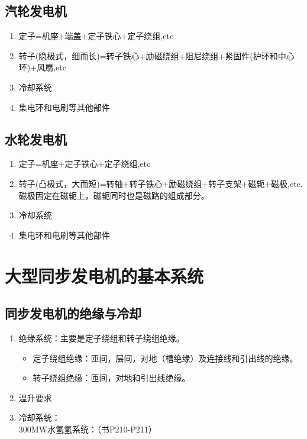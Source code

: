\documentclass[blue]{elegantnote}
\begin{document}
\subsection{汽轮发电机}
\begin{enumerate}
	\item 定子=机座+端盖+定子铁心+定子绕组,etc
	\item 转子(隐极式，细而长)=转子铁心+励磁绕组+阻尼绕组+紧固件(护环和中心环)+风扇,etc
	\item 冷却系统
	\item 集电环和电刷等其他部件
\end{enumerate}
\subsection{水轮发电机}
\begin{enumerate}
	\item 定子=机座+定子铁心+定子绕组,etc
	\item 转子(凸极式，大而短)=转轴+转子铁心+励磁绕组+转子支架+磁轭+磁极,etc.磁极固定在磁轭上，磁轭同时也是磁路的组成部分。
	\item 冷却系统
	\item 集电环和电刷等其他部件
\end{enumerate}
\section{大型同步发电机的基本系统}
\subsection{同步发电机的绝缘与冷却}
\begin{enumerate}
	\item 绝缘系统：主要是定子绕组和转子绕组绝缘。
	\begin{itemize}
		\item 定子绕组绝缘：匝间，层间，对地（槽绝缘）及连接线和引出线的绝缘。
		\item 转子绕组绝缘：匝间，对地和引出线绝缘。
	\end{itemize}
	\item 温升要求
	\item 冷却系统：\\
	300MW水氢氢系统：（书P210-P211）	
\end{enumerate}
\end{document}
